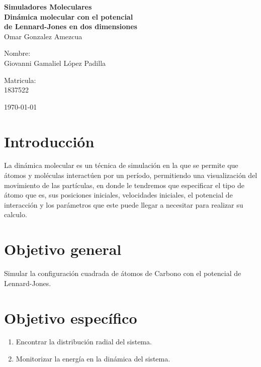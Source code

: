\documentclass[reprint,amsmath,amssymb,aps,]{revtex4-2}
\begin{document}
\begin{titlepage}
\begin{center}
\begin{large}
\vspace{1cm}
\large{\textbf{Simuladores Moleculares}}\\
\textbf{Dinámica molecular con el potencial \\ de Lennard-Jones en dos dimensiones}\\
Omar Gonzalez Amezcua\\
\end{large}
\vspace{3.5cm}
\begin{minipage}{0.6\linewidth}
\vspace{0.5cm}
\changefontsizes{14pt}
Nombre:\\
Giovanni Gamaliel López Padilla\\
\end{minipage}
\begin{minipage}{0.2\linewidth}
\changefontsizes{14pt}
Matricula:\\
1837522
\end{minipage}
\end{center}
\vspace{4cm}
\begin{flushright}
\today
\end{flushright}
\pagebreak
\end{titlepage}
\maketitle
\section{Introducción}
La dinámica molecular es un técnica de simulación en la que se permite que átomos y moléculas interactúen por un período, permitiendo una visualización del movimiento de las partículas, en donde le tendremos que especificar el tipo de átomo que es, sus posiciones iniciales, velocidades iniciales, el potencial de interacción y los parámetros que este puede llegar a necesitar para realizar su calculo.\\
\section{Objetivo general}
Simular la configuración cuadrada de átomos de Carbono con el potencial de Lennard-Jones.
\section{Objetivo específico}
\begin{enumerate}
    \item Encontrar la distribución radial del sistema.
    \item Monitorizar la energía en la dinámica del sistema.
\end{enumerate}
\end{document}
